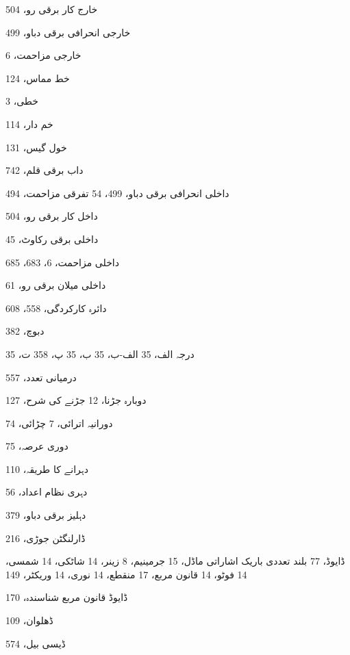 \begin{theindex}
\indexspace

\item خارج کار برقی رو، 504
\item خارجی انحرافی برقی دباو، 499
\item خارجی مزاحمت، 6
\item خط مماس، 124
\item خطی، 3
\item خم دار، 114
\item خول گیس، 131

\indexspace

\item داب برقی قلم، 742
\item داخلی 
     \subitem انحرافی برقی دباو، 499، 54 
     \subitem تفرقی مزاحمت، 494
\item داخل کار برقی رو، 504
\item داخلی برقی رکاوٹ، 45
\item داخلی مزاحمت، 6، 683، 685
\item داخلی میلان برقی رو، 61
\item دائرہ کارکردگی، 558، 608
\item دبوچ، 382
\item درجہ 
     \subitem الف، 35 
     \subitem الف-ب، 35 
     \subitem ب، 35 
     \subitem پ، 358 
     \subitem ت، 35
\item درمیانی تعدد، 557
\item دوبارہ 
     \subitem جڑنا، 12 
     \subitem جڑنے کی شرح، 127
\item دورانیہ 
     \subitem اترائی، 7 
     \subitem چڑائی، 74
\item دوری عرصہ، 75
\item دہرانے کا طریقہ، 110
\item دہری نظام اعداد، 56
\item دہلیز برقی دباو، 379

\indexspace

\item ڈارلنگٹن جوڑی، 216
\item ڈایوڈ، 77 
     \subitem بلند تعددی باریک اشاراتی ماڈل، 15 
     \subitem جرمینیم، 8 
     \subitem زینر، 14 
     \subitem شاٹکی، 14 
     \subitem شمسی، 14 
     \subitem فوٹو، 14 
     \subitem قانون مربع، 17 
     \subitem منقطع، 14 
     \subitem نوری، 14 
     \subitem وریکٹر، 149
\item ڈایوڈ قانون مربع شناسندہ، 170
\item ڈھلوان، 109
\item ڈیسی بیل، 574


\end{theindex}
